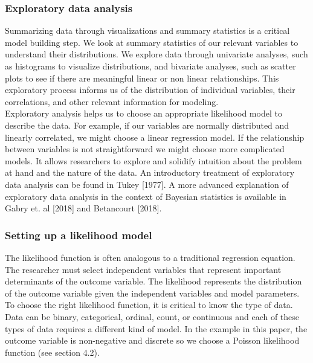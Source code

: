 \documentclass{article}
\begin{document}
\subsubsection{Exploratory data analysis}
Summarizing data through visualizations and summary statistics is a critical model building step. We look at summary statistics of our relevant variables to understand their distributions. We explore data through univariate analyses, such as histograms to visualize distributions, and bivariate analyses, such as scatter plots to see if there are meaningful linear or non linear relationships. This exploratory process informs us of the distribution of individual variables, their correlations, and other relevant information for modeling. \\
Exploratory analysis helps us to choose an appropriate likelihood model to describe the data. For example, if our variables are normally distributed and linearly correlated, we might choose a linear regression model. If the relationship between variables is not straightforward we might choose more complicated models.  It allows researchers to explore and solidify intuition about the problem at hand and the nature of the data. An introductory treatment of exploratory data analysis can be found in Tukey [1977]. A more advanced explanation of exploratory data analysis in the context of Bayesian statistics is available in Gabry et. al [2018] and Betancourt [2018].


\subsubsection{Setting up a likelihood model}
The likelihood function is often analogous to a traditional regression equation. The researcher must select independent variables that represent important determinants of the outcome variable. The likelihood represents the distribution of the outcome variable given the independent variables and model parameters. To choose the right likelihood function, it is critical to know the type of data. Data can be binary, categorical, ordinal, count, or continuous and each of these types of data requires a different kind of model. In the example in this paper, the outcome variable is non-negative and discrete so we choose a Poisson likelihood function (see section 4.2). 
 
\end{document}
